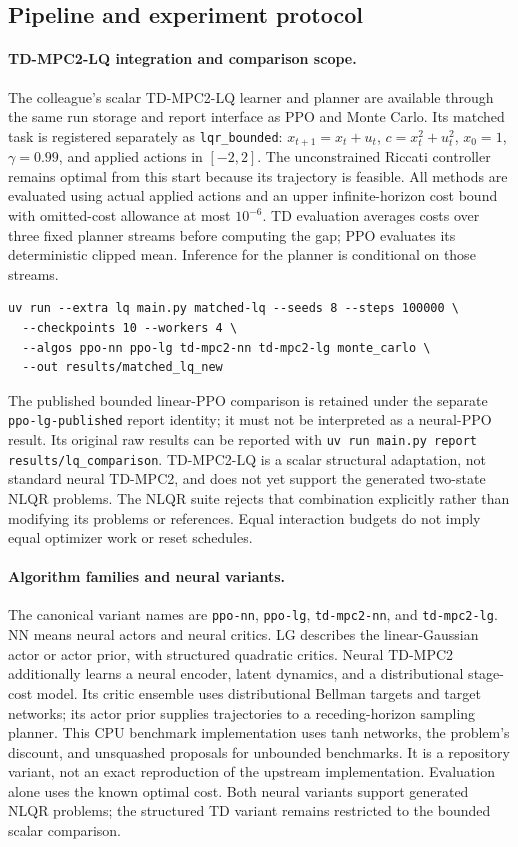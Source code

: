 \documentclass[11pt]{article}
\begin{document}
\subsection{Pipeline and experiment protocol}

\paragraph{TD-MPC2-LQ integration and comparison scope.}
The colleague's scalar TD-MPC2-LQ learner and planner are available through the
same run storage and report interface as PPO and Monte Carlo. Its matched task is
registered separately as \texttt{lqr\_bounded}: $x_{t+1}=x_t+u_t$,
$c=x_t^2+u_t^2$, $x_0=1$, $\gamma=0.99$, and applied actions in $[-2,2]$.
The unconstrained Riccati controller remains optimal from this start because its
trajectory is feasible. All methods are evaluated using actual applied actions
and an upper infinite-horizon cost bound with omitted-cost allowance at most
$10^{-6}$. TD evaluation averages costs over three fixed planner streams before
computing the gap; PPO evaluates its deterministic clipped mean. Inference for
the planner is conditional on those streams.

\begin{verbatim}
uv run --extra lq main.py matched-lq --seeds 8 --steps 100000 \
  --checkpoints 10 --workers 4 \
  --algos ppo-nn ppo-lg td-mpc2-nn td-mpc2-lg monte_carlo \
  --out results/matched_lq_new
\end{verbatim}
The published bounded linear-PPO comparison is retained under the separate
\texttt{ppo-lg-published} report identity; it must not be interpreted as a
neural-PPO result. Its original raw results can be reported with
\texttt{uv run main.py report results/lq\_comparison}.
TD-MPC2-LQ is a scalar structural adaptation, not standard neural TD-MPC2, and
does not yet support the generated two-state NLQR problems. The NLQR suite rejects
that combination explicitly rather than modifying its problems or references.
Equal interaction budgets do not imply equal optimizer work or reset schedules.

\paragraph{Algorithm families and neural variants.}
The canonical variant names are \texttt{ppo-nn}, \texttt{ppo-lg},
\texttt{td-mpc2-nn}, and \texttt{td-mpc2-lg}. NN means neural actors and
neural critics. LG describes the linear-Gaussian actor or actor prior, with
structured quadratic critics. Neural TD-MPC2 additionally learns a neural
encoder, latent dynamics, and a distributional stage-cost model. Its critic
ensemble uses distributional Bellman targets and target networks; its actor
prior supplies trajectories to a receding-horizon sampling planner.
This CPU benchmark implementation uses tanh networks, the problem's discount,
and unsquashed proposals for unbounded benchmarks. It is a repository variant,
not an exact reproduction of the upstream implementation. Evaluation alone uses
the known optimal cost. Both neural variants support generated NLQR problems;
the structured TD variant remains restricted to the bounded scalar comparison.
\end{document}

